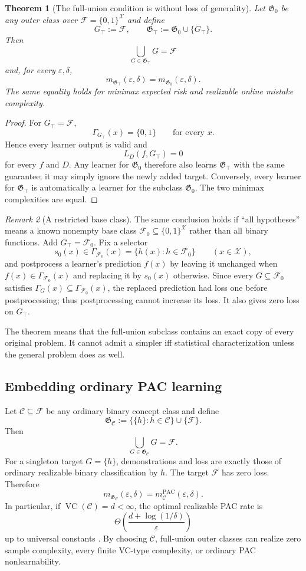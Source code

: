 \documentclass[11pt]{article}
\newtheorem{theorem}{Theorem}[section]
\theoremstyle{definition}
\theoremstyle{remark}
\newtheorem{remark}[theorem]{Remark}
\newcommand{\X}{\mathcal X}
\newcommand{\Y}{\{0,1\}}
\newcommand{\F}{\mathcal F}
\newcommand{\Outer}{\mathfrak G}
\newcommand{\eps}{\varepsilon}
\newcommand{\1}{\mathbf 1}
\begin{document}
\begin{theorem}[The full-union condition is without loss of generality]
Let $\Outer_0$ be any outer class over $\F=\Y^{\X}$ and define
\[
    G_{\top}:=\F,
    \qquad
    \Outer_{\top}:=\Outer_0\cup\{G_{\top}\}.
\]
Then
\[
    \bigcup_{G\in\Outer_{\top}}G=\F
\]
and, for every $\eps,\delta$,
\[
    m_{\Outer_{\top}}(\eps,\delta)
    =
    m_{\Outer_0}(\eps,\delta).
\]
The same equality holds for minimax expected risk and realizable online mistake complexity.
\end{theorem}

\begin{proof}
For $G_{\top}=\F$,
\[
    \Gamma_{G_{\top}}(x)=\{0,1\}
    \qquad\text{for every }x.
\]
Hence every learner output is valid and
\[
    L_D(f,G_{\top})=0
\]
for every $f$ and $D$. Any learner for $\Outer_0$ therefore also learns $\Outer_{\top}$ with the same guarantee; it may simply ignore the newly added target. Conversely, every learner for $\Outer_{\top}$ is automatically a learner for the subclass $\Outer_0$. The two minimax complexities are equal.
\end{proof}

\begin{remark}[A restricted base class]
The same conclusion holds if ``all hypotheses'' means a known nonempty base class $\F_0\subseteq\Y^{\X}$ rather than all binary functions. Add $G_{\top}=\F_0$. Fix a selector
\[
    s_0(x)\in \Gamma_{\F_0}(x)=\{h(x):h\in\F_0\}
    \qquad(x\in\X),
\]
and postprocess a learner's prediction $f(x)$ by leaving it unchanged when $f(x)\in\Gamma_{\F_0}(x)$ and replacing it by $s_0(x)$ otherwise. Since every $G\subseteq\F_0$ satisfies $\Gamma_G(x)\subseteq\Gamma_{\F_0}(x)$, the replaced prediction had loss one before postprocessing; thus postprocessing cannot increase its loss. It also gives zero loss on $G_{\top}$.
\end{remark}

The theorem means that the full-union subclass contains an exact copy of every original problem. It cannot admit a simpler iff statistical characterization unless the general problem does as well.

\subsection{Embedding ordinary PAC learning}

Let $\mathcal C\subseteq\F$ be any ordinary binary concept class and define
\[
    \Outer_{\mathcal C}
    :=
    \{\{h\}:h\in\mathcal C\}
    \cup
    \{\F\}.
\]
Then
\[
    \bigcup_{G\in\Outer_{\mathcal C}}G=\F.
\]
For a singleton target $G=\{h\}$, demonstrations and loss are exactly those of ordinary realizable binary classification by $h$. The target $\F$ has zero loss. Therefore
\[
    m_{\Outer_{\mathcal C}}(\eps,\delta)
    =
    m_{\mathcal C}^{\mathrm{PAC}}(\eps,\delta).
\]
In particular, if $\operatorname{VC}(\mathcal C)=d<\infty$, the optimal realizable PAC rate is
\[
    \Theta\!\left(
        \frac{d+\log(1/\delta)}{\eps}
    \right)
\]
up to universal constants \cite{Hanneke2016}. By choosing $\mathcal C$, full-union outer classes can realize zero sample complexity, every finite VC-type complexity, or ordinary PAC nonlearnability.
\end{document}
